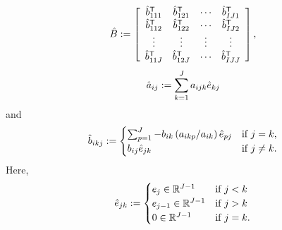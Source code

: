 \begin{equation*}
\hat{B} := \left[
\begin{array}{ccccc}
	\hat{b}_{111}^{\mbox{\scriptsize\sf T}} & \hat{b}_{121}^{\mbox{\scriptsize\sf T}} & \cdots & \hat{b}_{IJ1}^{\mbox{\scriptsize\sf T}}\\
	\hat{b}_{112}^{\mbox{\scriptsize\sf T}} & \hat{b}_{122}^{\mbox{\scriptsize\sf T}} & \cdots & \hat{b}_{IJ2}^{\mbox{\scriptsize\sf T}}\\
	\vdots		& \vdots		& \vdots	& \vdots	\\
	\hat{b}_{11J}^{\mbox{\scriptsize\sf T}} & \hat{b}_{12J}^{\mbox{\scriptsize\sf T}} & \cdots & \hat{b}_{IJJ}^{\mbox{\scriptsize\sf T}}
\end{array} \right],
\end{equation*}
\begin{equation*}
\hat{a}_{ij} := \sum_{k=1}^J  a_{ijk} \hat{e}_{kj}
\end{equation*}
and
\begin{equation*}
\hat{b}_{ikj} := 
	\begin{cases}
		\sum_{p =1}^J -b_{ik}\left(a_{ikp}/a_{ik}\right)\hat{e}_{pj} & \text{if $j=k$},\\
		b_{ij} \hat{e}_{jk} & \text{if $j\neq k$}.
	\end{cases}
\end{equation*}
Here, 
\begin{equation*}
\hat{e}_{jk} := 
	\begin{cases}
		e_j \in {\mathbb R}^{J-1} & \text{if $j<k$}\\
		e_{j-1} \in {\mathbb R}^{J-1} & \text{if $j>k$}\\
		0\in {\mathbb R}^{J-1}		& \text{if $j=k$}.
	\end{cases}
\end{equation*}%
